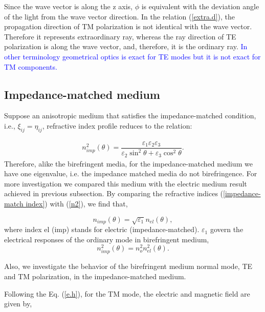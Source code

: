 \documentclass[9pt,twocolumn,twoside]{osajnl}
\begin{document}
Since the wave vector is along the z axis, $\phi$ is equivalent with the deviation angle of the light from the wave vector direction.
In the relation (\ref{extra.d}), the propagation direction of TM polarization is not identical with the wave vector. Therefore it represents extraordinary ray, whereas the ray direction of TE polarization is along the wave vector, and, therefore, it is the ordinary ray. 
\textcolor{blue}{In other terminology geometrical optics is exact for TE modes but it is not exact for TM components. }

\subsection{Impedance-matched medium}\label{impedance-matched}

 Suppose an anisotropic medium that satisfies the impedance-matched condition, i.e., $ \xi_{ij} =\eta_{ij} $, refractive index profile reduces to the relation:

\begin{align}\label{impedance-match index}
n_{imp}^{2}(\theta)=\dfrac{\varepsilon_{1}\varepsilon_{2}\varepsilon_{3}}{\varepsilon_{2}\sin^{2}{\theta}+\varepsilon_{3}\cos^{2}{\theta}}.
\end{align}
Therefore, alike the birefringent media, for the impedance-matched medium we have one eigenvalue, i.e. the impedance matched media do not birefringence. For more investigation we compared this medium with the electric medium result achieved in previous subsection. By comparing the refractive indices (\ref{impedance-match index}) with (\ref{n2}), we find that,

\begin{equation}\label{comper-n}
n_{imp}(\theta)=\sqrt{\varepsilon_{1}}n_{el}(\theta),
\end{equation}
where index el (imp) stands for  electric (impedance-matched). ${\varepsilon_{1}}$ govern the electrical responses of the ordinary mode in birefringent medium,
\begin{equation}\label{comper-n1}
n_{imp}^{2}(\theta)=n_{o}^{2}n_{el}^{2}(\theta).
\end{equation}

 Also, we investigate the behavior of the birefringent medium normal mode, TE and TM polarization, in the impedance-matched medium.
 
Following the Eq. (\ref{e.h}),  for the TM mode, the electric and magnetic field are given by,
\end{document}

